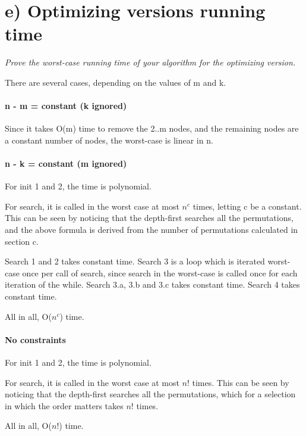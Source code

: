 
\section{e) Optimizing versions running time}

\textit{Prove the worst-case running time of your algorithm for the optimizing version.}

There are several cases, depending on the values of m and k.

\paragraph{n - m = constant (k ignored)}

Since it takes O(m) time to remove the 2..m nodes,
and the remaining nodes are a constant number of nodes,
the worst-case is linear in n.

\paragraph{n - k = constant (m ignored)}

For init 1 and 2, the time is polynomial.

For search, it is called in the worst case
at most \(n^{c}\) times, letting c be a constant.
This can be seen by noticing that the depth-first
searches all the permutations, and the above formula
is derived from the number of permutations calculated
in section c.

Search 1 and 2 takes constant time.
Search 3 is a loop which is iterated worst-case once per call
of search, since search in the worst-case
is called once for each iteration of the while.
Search 3.a, 3.b and 3.c takes constant time.
Search 4 takes constant time.

All in all, O(\(n^{c}\)) time.

\paragraph{No constraints}

For init 1 and 2, the time is polynomial.

For search, it is called in the worst case
at most \(n!\) times.
This can be seen by noticing that the depth-first
searches all the permutations, which for a selection
in which the order matters takes \(n!\) times.

All in all, O(\(n!\)) time.

